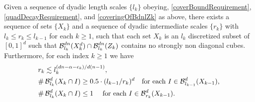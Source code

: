 \begin{lemma} 
	Given a sequence of dyadic length scales $\{l_k\}$ obeying, \eqref{coverBoundRequirement}, \eqref{quadDecayRequirement}, and \eqref{coveringOfBdnlZk} as above, there exists a sequence of sets $\{X_k\}$ and a sequence of dyadic intermediate scales $\{ r_k \}$ with $l_k \leq r_k \leq l_{k-1}$ for each $k \geq 1$, such that each set $X_k$ is an $l_k$ discretized subset of $[0,1]^d$ such that $\operatorname{\mathcal{B}}^{dn}_{l_k}(X_k^d) \cap \operatorname{\mathcal{B}}^{dn}_{l_k}(Z_k)$ contains no strongly non diagonal cubes. Furthermore, for each index $k\geq 1$ we have
	\begin{align}
		& r_k \lesssim l_k^{(dn-\alpha -\epsilon_k)/d(n-1)},\label{rkSizeBound}\\
		& \# \operatorname{\mathcal{B}}^d_{l_k}(X_k \cap I) \geq 0.5 \cdot (l_{k-1}/r_k)^d \quad \text{for each}\ I\in \operatorname{\mathcal{B}}_{l_{k-1}}^d(X_{k-1}), \label{manyIkInIkm1}\\
		&\# \operatorname{\mathcal{B}}^d_{l_k}(X_k \cap I) \leq 1 \quad \text{ for each}\ I \in \operatorname{\mathcal{B}}_{r_{k}}^d(X_{k-1}).\label{XkWellDistributed}
	\end{align}
\end{lemma}
